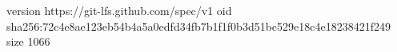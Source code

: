 version https://git-lfs.github.com/spec/v1
oid sha256:72c4e8ae123eb54b4a5a0edfd34fb7b1f1f0b3d51bc529e18c4e18238421f249
size 1066

